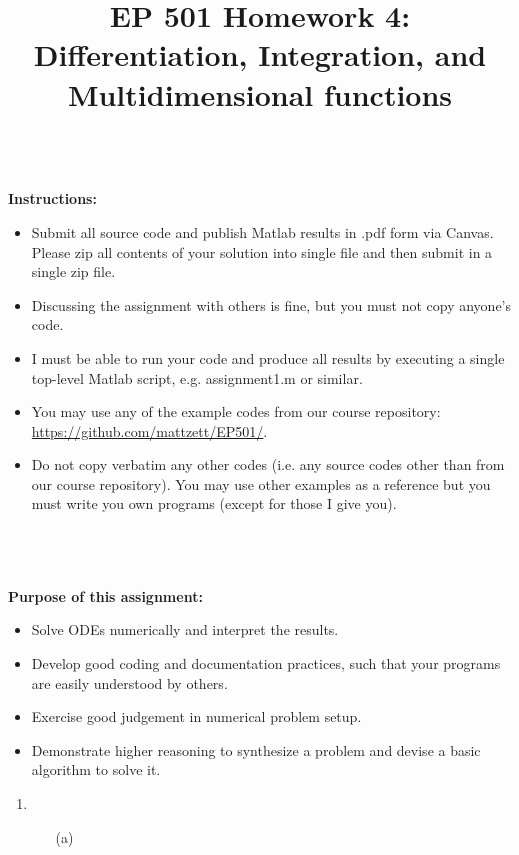 \documentclass{article}
\begin{document}
\title{EP 501 Homework 4:  Differentiation, Integration, and Multidimensional functions}

\maketitle

~\\
\textbf{Instructions:}  
\begin{itemize}
  \item Submit all source code and publish Matlab results in .pdf form via Canvas.  Please zip all contents of your solution into single file and then submit in a single zip file.    
  \item Discussing the assignment with others is fine, but you must not copy anyone's code.  
  \item I must be able to run your code and produce all results by executing a single top-level Matlab script, e.g. \textsf{assignment1.m} or similar.  
  \item You may use any of the example codes from our course repository:  \url{https://github.com/mattzett/EP501/}.
  \item Do not copy verbatim any other codes (i.e. any source codes other than from our course repository).  You may use other examples as a reference but you must write you own programs (except for those I give you).  

\end{itemize}
~\\~\\~\\
\textbf{Purpose of this assignment:}  
\begin{itemize}
  \item Solve ODEs numerically and interpret the results.  
  \item Develop good coding and documentation practices, such that your programs are easily understood by others.  
  \item Exercise good judgement in numerical problem setup.
  \item Demonstrate higher reasoning to synthesize a problem and devise a basic algorithm to solve it.  
\end{itemize}

\pagebreak

\begin{enumerate}
  \item    
  \begin{itemize}
    \item[(a)]  
  \end{itemize}
\end{enumerate}
\end{document}

